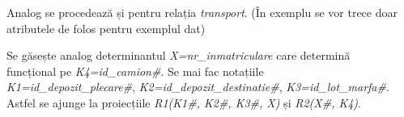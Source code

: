 \documentclass[12pt, a4paper]{article}
\begin{document}
\begin{table}[!htbp]
\begin{center}
    \caption{R2(X\#, K3)}\label{tab12-2}
\end{center}
\end{table}

Analog se procedează și pentru relația \emph{transport}. (În exemplu se vor trece doar atributele de folos pentru exemplul dat)

\begin{table}[!htbp]
\begin{center}
    \caption{Relația \emph{transport}}\label{tab13}
\end{center}
\end{table}

Se găsește analog determinantul \emph{X=nr\_inmatriculare} care determină \\funcțional pe \emph{K4=id\_camion\#}. Se mai fac notațiile \\\emph{K1=id\_depozit\_plecare\#}, \emph{K2=id\_depozit\_destinatie\#}, \emph{K3=id\_lot\_marfa\#}. \\Astfel se ajunge la proiecțiile \emph{R1(K1\#, K2\#, K3\#, X)} și \emph{R2(X\#, K4)}.
\end{document}
